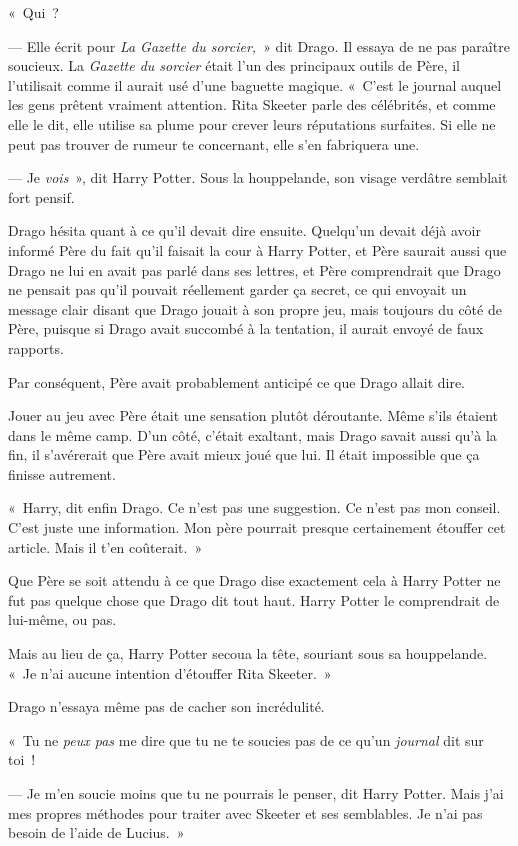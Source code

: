 «~Qui~?

--- Elle écrit pour \emph{La Gazette du sorcier,}~» dit Drago.
Il essaya de ne pas paraître soucieux.
La \emph{Gazette du sorcier} était l'un des principaux outils de Père, il l'utilisait comme il aurait usé d'une baguette magique.
«~C'est le journal auquel les gens prêtent vraiment attention.
Rita Skeeter parle des célébrités, et comme elle le dit, elle utilise sa plume pour crever leurs réputations surfaites.
Si elle ne peut pas trouver de rumeur te concernant, elle s'en fabriquera une.

--- Je \emph{vois}~», dit Harry Potter.
Sous la houppelande, son visage verdâtre semblait fort pensif.

Drago hésita quant à ce qu'il devait dire ensuite.
Quelqu'un devait déjà avoir informé Père du fait qu'il faisait la cour à Harry Potter, et Père saurait aussi que Drago ne lui en avait pas parlé dans ses lettres, et Père comprendrait que Drago ne pensait pas qu'il pouvait réellement garder ça secret, ce qui envoyait un message clair disant que Drago jouait à son propre jeu, mais toujours du côté de Père, puisque si Drago avait succombé à la tentation, il aurait envoyé de faux rapports.

Par conséquent, Père avait probablement anticipé ce que Drago allait dire.

Jouer au jeu avec Père était une sensation plutôt déroutante.
Même s'ils étaient dans le même camp.
D'un côté, c'était exaltant, mais Drago savait aussi qu'à la fin, il s'avérerait que Père avait mieux joué que lui.
Il était impossible que ça finisse autrement.

«~Harry, dit enfin Drago.
Ce n'est pas une suggestion.
Ce n'est pas mon conseil.
C'est juste une information.
Mon père pourrait presque certainement étouffer cet article.
Mais il t'en coûterait.~»

Que Père se soit attendu à ce que Drago dise exactement cela à Harry Potter ne fut pas quelque chose que Drago dit tout haut.
Harry Potter le comprendrait de lui-même, ou pas.

Mais au lieu de ça, Harry Potter secoua la tête, souriant sous sa houppelande.
«~Je n'ai aucune intention d'étouffer Rita Skeeter.~»

Drago n'essaya même pas de cacher son incrédulité.

«~Tu ne \emph{peux pas} me dire que tu ne te soucies pas de ce qu'un \emph{journal} dit sur toi~!

--- Je m'en soucie moins que tu ne pourrais le penser, dit Harry Potter.
Mais j'ai mes propres méthodes pour traiter avec Skeeter et ses semblables.
Je n'ai pas besoin de l'aide de Lucius.~»


